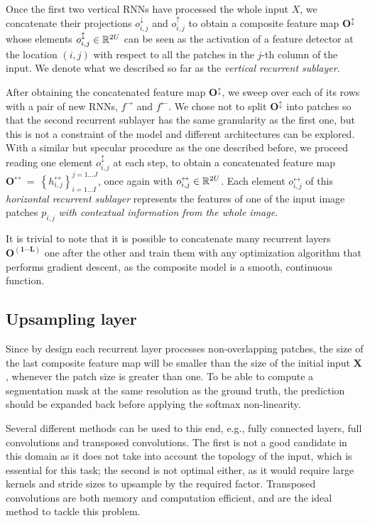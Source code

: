 Once the first two vertical RNNs have processed the whole input $X$, we
concatenate their projections $o^{\downarrow}_{i,j}$ and $o^{\uparrow}_{i,j}$
to obtain a composite feature map $\mathbf{O^{\updownarrow}}$ whose elements
$o^{\updownarrow}_{i,j} \in \mathbb{R}^{2U}$ can be seen as the activation of a
feature detector at the location $(i,j)$ with respect to all the patches in the
$j$-th column of the input. We denote what we described so far as the
\emph{vertical recurrent sublayer}.

After obtaining the concatenated feature map $\mathbf{O^{\updownarrow}}$, we
sweep over each of its rows with a pair of new RNNs, $f^{\rightarrow}$ and
$f^{\leftarrow}$. We chose not to split $\mathbf{O^{\updownarrow}}$ into
patches so that the second recurrent sublayer has the same granularity as the
first one, but this is not a constraint of the model and different
architectures can be explored.  With a similar but specular procedure as the
one described before, we proceed reading one element $o^\updownarrow_{i,j}$ at
each step, to obtain a concatenated feature map
$\mathbf{O^\leftrightarrow}~=~\left\{ h^\leftrightarrow_{i,j} \right\}
_{i=1\dots I}^{j=1\dots J}$, once again with $o^\leftrightarrow_{i,j} \in
\mathbb{R}^{2U}$. Each element $o^\leftrightarrow_{i,j}$ of this \emph{horizontal
recurrent sublayer} represents the features of one of the input image patches
$p_{i,j}$ \emph{with contextual information from the whole image}.

It is trivial to note that it is possible to concatenate many recurrent layers
$\mathbf{O^{(1 \cdots L)}}$ one after the other and train them with any
optimization algorithm that performs gradient descent, as the composite model
is a smooth, continuous function.

\subsection{Upsampling layer}\label{sec:upsampling}
Since by design each recurrent layer processes non-overlapping patches, the
size of the last composite feature map will be smaller than the size of the
initial input $\mathbf{X}$, whenever the patch size is greater than one. To be
able to compute a segmentation mask at the same resolution as the ground truth,
the prediction should be expanded back before applying the softmax non-linearity.

Several different methods can be used to this end, e.g., fully connected
layers, full convolutions and transposed convolutions. The first is not a good
candidate in this domain as it does not take into account the topology of the
input, which is essential for this task; the second is not optimal either, as
it would require large kernels and stride sizes to upsample by the
required factor. Transposed convolutions are both memory and
computation efficient, and are the ideal method to tackle this problem.

